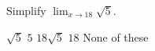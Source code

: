 \question
Simplify $\lim_{x\to 18}\sqrt{5}$.

\begin{oneparchoices}
  \CorrectChoiceEmphasis{\large\bfseries\boldmath}
      \CorrectChoice $\sqrt{5}$ %
      \choice $5$
      \choice $18\sqrt{5}$
      \choice $18$
      \choice None of these
\end{oneparchoices}

